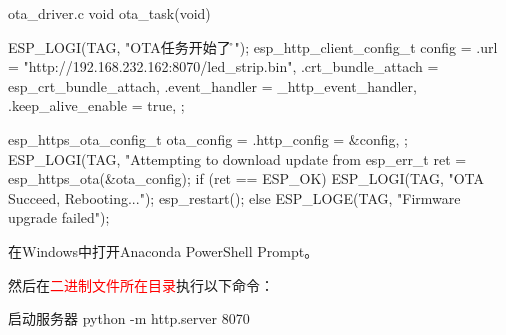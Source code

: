 \documentclass[lang=cn,newtx,10pt,scheme=chinese]{elegantbook}
\begin{document}
\begin{mycode}{ota\_driver.c}
void ota_task(void)
{
    ESP_LOGI(TAG, "OTA任务开始了。\r\n");
    esp_http_client_config_t config = {
        .url = "http://192.168.232.162:8070/led_strip.bin",
        .crt_bundle_attach = esp_crt_bundle_attach,
        .event_handler = _http_event_handler,
        .keep_alive_enable = true,
    };

    esp_https_ota_config_t ota_config = {
        .http_config = &config,
    };
    ESP_LOGI(TAG, "Attempting to download update from %
    esp_err_t ret = esp_https_ota(&ota_config);
    if (ret == ESP_OK)
    {
        ESP_LOGI(TAG, "OTA Succeed, Rebooting...");
        esp_restart();
    }
    else
    {
        ESP_LOGE(TAG, "Firmware upgrade failed");
    }
}
\end{mycode}

在Windows中打开Anaconda PowerShell Prompt。

然后在\textcolor{red}{二进制文件所在目录}执行以下命令：

\begin{mycode}{启动服务器}
python -m http.server 8070
\end{mycode}
\end{document}
